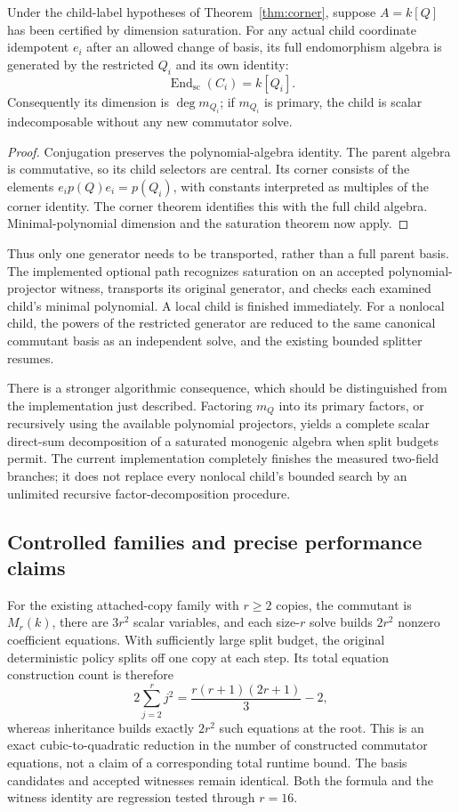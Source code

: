 \begin{corollary}
\label{cor:monogenic-corner}
Under the child-label hypotheses of Theorem~\ref{thm:corner},
suppose $A=k[Q]$ has been certified by dimension saturation. For any actual
child coordinate idempotent $e_i$ after an allowed change of basis, its full
endomorphism algebra is generated by the restricted $Q_i$ and its own
identity:
\[
 \operatorname{End}_{\mathrm{sc}}(C_i)=k[Q_i].
\]
Consequently its dimension is $\deg m_{Q_i}$; if $m_{Q_i}$ is primary, the
child is scalar indecomposable without any new commutator solve.
\end{corollary}

\begin{proof}
Conjugation preserves the polynomial-algebra identity. The parent algebra
is commutative, so its child selectors are central. Its corner consists of
the elements $e_ip(Q)e_i=p(Q_i)$, with constants interpreted as multiples
of the corner identity. The corner theorem identifies this with the full
child algebra. Minimal-polynomial dimension and the saturation theorem
now apply.\end{proof}

Thus only one generator needs to be transported, rather than a full parent
basis. The implemented optional path recognizes saturation on an accepted
polynomial-projector witness, transports its original generator, and checks
each examined child's minimal polynomial. A local child is finished
immediately. For a nonlocal child, the powers of the restricted generator
are reduced to the same canonical commutant basis as an independent solve,
and the existing bounded splitter resumes.

There is a stronger algorithmic consequence, which should be distinguished
from the implementation just described. Factoring $m_Q$ into its primary
factors, or recursively using the available polynomial projectors, yields a
complete scalar direct-sum decomposition of a saturated monogenic algebra
when split budgets permit. The current implementation completely finishes
the measured two-field branches; it does not replace every nonlocal child's
bounded search by an unlimited recursive factor-decomposition procedure.

\subsection{Controlled families and precise performance claims}

For the existing attached-copy family with $r\geq2$ copies, the commutant is
$M_r(k)$, there are $3r^2$ scalar variables, and each size-$r$ solve builds
$2r^2$ nonzero coefficient equations. With sufficiently large split budget,
the original deterministic policy splits off one copy at each step. Its
total equation construction count is therefore
\[
 2\sum_{j=2}^r j^2
   =\frac{r(r+1)(2r+1)}3-2,
\]
whereas inheritance builds exactly $2r^2$ such equations at the root. This
is an exact cubic-to-quadratic reduction in the number of constructed
commutator equations, not a claim of a corresponding total runtime bound.
The basis candidates and accepted witnesses remain identical. Both the
formula and the witness identity are regression tested through $r=16$.

